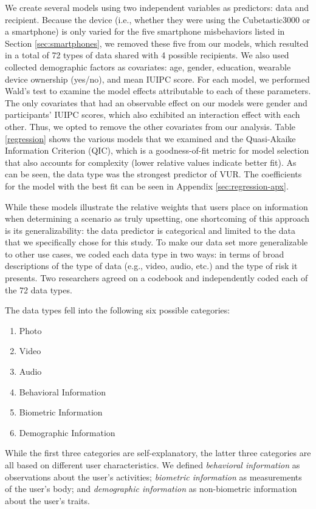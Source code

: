 We create several models using two independent variables as predictors: data and recipient. Because the device (i.e., whether they were using the Cubetastic3000 or a smartphone) is only varied for the five smartphone misbehaviors listed in Section \ref{sec:smartphones}, we removed these five  from our models, which resulted in a total of 72 types of data shared with 4 possible recipients. We also used collected demographic factors as covariates: age, gender, education, wearable device ownership (yes/no), and mean IUIPC score. For each model, we performed Wald's test to examine the model effects attributable to each of these parameters. The only covariates that had an observable effect on our models were gender and participants' IUIPC scores, which also exhibited an interaction effect with each other. Thus, we opted to remove the other covariates from our analysis. Table \ref{regression} shows the various models that we examined and the Quasi-Akaike Information Criterion (QIC), which is a goodness-of-fit metric for model selection that also accounts for complexity (lower relative values indicate better fit). As can be seen, the data type was the strongest predictor of VUR. The coefficients for the model with the best fit can be seen in Appendix \ref{sec:regression-apx}.

While these models illustrate the relative weights that users place on information when determining a scenario as truly upsetting, one shortcoming of this approach is its generalizability: the data predictor is categorical and limited to the data that we specifically chose for this study. To make our data set more generalizable to other use cases, we coded each data type in two ways: in terms of broad descriptions of the type of data (e.g., video, audio, etc.) and the type of risk it presents. Two researchers agreed on a codebook and independently coded each of the 72 data types.

The data types fell into the following six possible categories:
\begin{enumerate}[topsep=0pt,itemsep=-1ex,partopsep=1ex,parsep=1ex]
\item Photo
\item Video
\item Audio
\item Behavioral Information
\item Biometric Information
\item Demographic Information
\end{enumerate}

While the first three categories are self-explanatory, the latter three categories are all based on different user characteristics. We defined {\it behavioral information} as observations about the user's activities; {\it biometric information} as measurements of the user's body; and {\it demographic information} as non-biometric information about the user's traits. 

